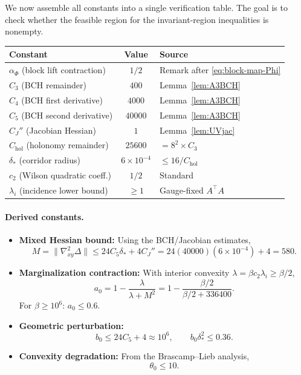 \documentclass[11pt]{article}
\theoremstyle{definition}
\newcommand{\1}{\mathbf{1}}
\begin{document}
We now assemble all constants into a single verification table. The goal is to check whether 
the feasible region for the invariant-region inequalities is nonempty.

\begin{center}
\renewcommand{\arraystretch}{1.3}
\begin{tabular}{|l|c|l|}
\hline
\textbf{Constant} & \textbf{Value} & \textbf{Source} \\
\hline
$\alpha_\Phi$ (block lift contraction) & $1/2$ & Remark after \eqref{eq:block-map-Phi} \\
$C_3$ (BCH remainder) & $400$ & Lemma~\ref{lem:A3BCH} \\
$C_4$ (BCH first derivative) & $4000$ & Lemma~\ref{lem:A3BCH} \\
$C_5$ (BCH second derivative) & $40000$ & Lemma~\ref{lem:A3BCH} \\
$C_J''$ (Jacobian Hessian) & $1$ & Lemma~\ref{lem:UVjac} \\
$C_{\mathrm{hol}}$ (holonomy remainder) & $25600$ & $= 8^2 \times C_3$ \\
$\delta_*$ (corridor radius) & $6 \times 10^{-4}$ & $\le 16/C_{\mathrm{hol}}$ \\
$c_2$ (Wilson quadratic coeff.) & $1/2$ & Standard \\
$\lambda_i$ (incidence lower bound) & $\ge 1$ & Gauge-fixed $A^\top A$ \\
\hline
\end{tabular}
\end{center}

\paragraph{Derived constants.}

\begin{itemize}
\item \textbf{Mixed Hessian bound:} Using the BCH/Jacobian estimates,
\[
M = \|\nabla^2_{xy}\Delta\| \le 24 C_5 \delta_* + 4 C_J'' = 24(40000)(6 \times 10^{-4}) + 4 = 580.
\]

\item \textbf{Marginalization contraction:} With interior convexity $\lambda = \beta c_2 \lambda_i \ge \beta/2$,
\[
a_0 = 1 - \frac{\lambda}{\lambda + M^2} = 1 - \frac{\beta/2}{\beta/2 + 336400}.
\]
For $\beta \ge 10^6$: $a_0 \le 0.6$.

\item \textbf{Geometric perturbation:}
\[
b_0 \le 24 C_5 + 4 \approx 10^6, \qquad b_0 \delta_*^2 \le 0.36.
\]

\item \textbf{Convexity degradation:} From the Brascamp--Lieb analysis,
\[
\theta_0 \le 10.
\]
\end{itemize}
\end{document}
